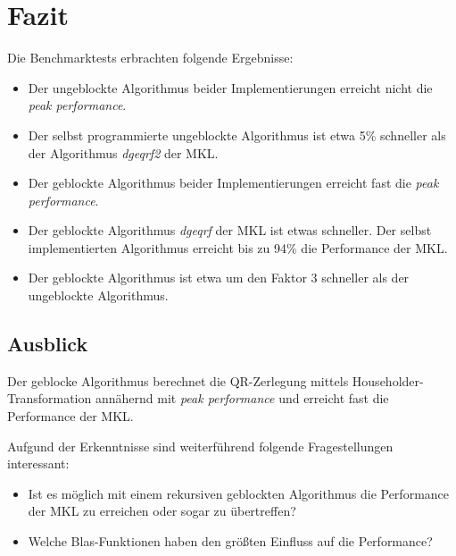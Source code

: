 \newpage
\section{Fazit}
Die Benchmarktests erbrachten folgende Ergebnisse:
\begin{itemize}
	\item Der ungeblockte Algorithmus beider Implementierungen erreicht nicht die \textit{peak performance}.
	\item Der selbst programmierte ungeblockte Algorithmus ist etwa 5\% schneller als der Algorithmus \textit{dgeqrf2} der MKL.
	\item Der geblockte Algorithmus beider Implementierungen erreicht fast die \textit{peak performance}.
	\item Der geblockte Algorithmus \textit{dgeqrf} der MKL ist etwas schneller. Der selbst implementierten Algorithmus erreicht bis zu 94\% die Performance der MKL.
	
	\item Der geblockte Algorithmus ist etwa um den Faktor 3 schneller als der ungeblockte Algorithmus.
\end{itemize}


\subsection{Ausblick}
Der geblocke Algorithmus berechnet die QR-Zerlegung mittels Householder-Transformation annähernd mit \textit{peak performance} und erreicht fast die Performance der MKL.

Aufgund der Erkenntnisse sind weiterführend folgende Fragestellungen interessant:
\begin{itemize}
	\item Ist es möglich mit einem rekursiven geblockten Algorithmus die Performance der MKL zu erreichen oder sogar zu übertreffen?
	\item Welche Blas-Funktionen haben den größten Einfluss auf die Performance? 
\end{itemize}











   
